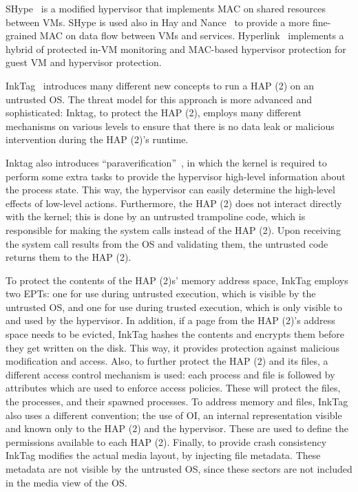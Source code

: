 \par SHype~\cite{sailer2005building} is a modified hypervisor that implements \ac{MAC} on shared resources between \ac{VM}s. SHype is used also in Hay and Nance~\cite{hay2008forensics} to provide a more fine-grained \ac{MAC} on data flow between \ac{VM}s and services. Hyperlink~\cite{xiao2016hyperlink} implements a hybrid of protected in-\ac{VM} monitoring and \ac{MAC}-based hypervisor protection for guest \ac{VM} and hypervisor protection.

\par InkTag~\cite{hofmann2013inktag} introduces many different new concepts to run a \ac{HAP (2)} on an untrusted \ac{OS}. The threat model for this approach is more advanced and sophisticated: Inktag, to protect the \ac{HAP (2)}, employs many different mechanisms on various levels to ensure that there is no data leak or malicious intervention during the \ac{HAP (2)}'s runtime. 

\par Inktag also introduces ``paraverification''~\cite{hofmann2013inktag}, in which the kernel is required to perform some extra tasks to provide the hypervisor high-level information about the process state. This way, the hypervisor can easily determine the high-level effects of low-level actions. Furthermore, the \ac{HAP (2)} does not interact directly with the kernel; this is done by an untrusted trampoline code, which is responsible for making the system calls instead of the \ac{HAP (2)}. Upon receiving the system call results from the \ac{OS} and validating them, the untrusted code returns them to the \ac{HAP (2)}.

\par To protect the contents of the \ac{HAP (2)}s' memory address space, InkTag employs two \acp{EPT}: one for use during untrusted execution, which is visible by the untrusted \ac{OS}, and one for use during trusted execution, which is only visible to and used by the hypervisor. In addition, if a page from the \ac{HAP (2)}'s address space needs to be evicted, InkTag hashes the contents and encrypts them before they get written on the disk. This way, it provides protection against malicious modification and access.
Also, to further protect the \ac{HAP (2)} and its files, a different access control mechanism is used: each process and file is followed by attributes which are used to enforce access policies. These will protect the files, the processes, and their spawned processes. To address memory and files, InkTag also uses a different convention; the use of \ac{OI}, an internal representation visible and known only to the \ac{HAP (2)} and the hypervisor. These are used to define the permissions available to each \ac{HAP (2)}.
Finally, to provide crash consistency InkTag modifies the actual media layout, by injecting file metadata. These metadata are not visible by the untrusted \ac{OS}, since these sectors are not included in the media view of the \ac{OS}. 

